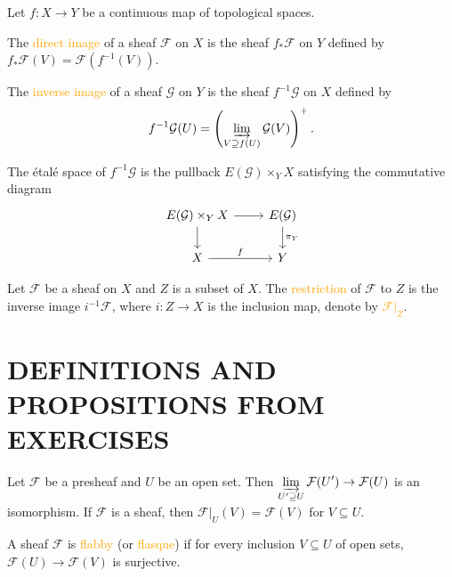 \begin{definition}
	Let $f:X\rightarrow Y$ be a continuous map of topological spaces.
	
	The \textcolor{orange}{direct image} of a sheaf $\mathcal{F}$ on $X$ is the sheaf $f_*\mathcal{F}$ on $Y$ defined by $f_*\mathcal{F}(V)=\mathcal{F}\!\left(f^{-1}(V)\right)$.
	
	The \textcolor{orange}{inverse image} of a sheaf $\mathcal{G}$ on $Y$ is the sheaf $f^{-1}\mathcal{G}$ on $X$ defined by
	\begin{equation*}
		f^{-1}\mathcal{G}(U)=\left(\varinjlim_{V\supseteq f(U)}\mathcal{G}(V)\right)^+.
	\end{equation*}
	
	The \'etal\'e space of $f^{-1}\mathcal{G}$ is the pullback $E(\mathcal{G})\times_YX$ satisfying the commutative diagram
	\begin{equation*}
		\begin{tikzcd}
			E(\mathcal{G})\times_YX\arrow[r]\arrow[d]&E(\mathcal{G})\arrow[d,"\pi_Y"]\\
			X\arrow[r,"f"]&Y
		\end{tikzcd}
	\end{equation*}
\end{definition}

\begin{definition}
	Let $\mathcal{F}$ be a sheaf on $X$ and $Z$ is a subset of $X$. The \textcolor{orange}{restriction} of $\mathcal{F}$ to $Z$ is the inverse image $i^{-1}\mathcal{F}$, where $i:Z\rightarrow X$ is the inclusion map, denote by \textcolor{orange}{$\mathcal{F}|_Z$}.
\end{definition}

\section*{DEFINITIONS AND PROPOSITIONS FROM EXERCISES}

\begin{proposition*}
	Let $\mathcal{F}$ be a presheaf and $U$ be an open set. Then $\displaystyle\varinjlim_{U^\prime\supseteq U}\mathcal{F}\!\left(U^\prime\right)\rightarrow\mathcal{F}(U)$ is an isomorphism. If $\mathcal{F}$ is a sheaf, then $\mathcal{F}|_U(V)=\mathcal{F}(V)$ for $V\subseteq U$.
\end{proposition*}

\begin{definition}
	A sheaf $\mathcal{F}$ is \textcolor{orange}{flabby}  (or \textcolor{orange}{flasque}) if for every inclusion $V\subseteq U$ of open sets, $\mathcal{F}(U)\rightarrow\mathcal{F}(V)$ is surjective.
\end{definition}